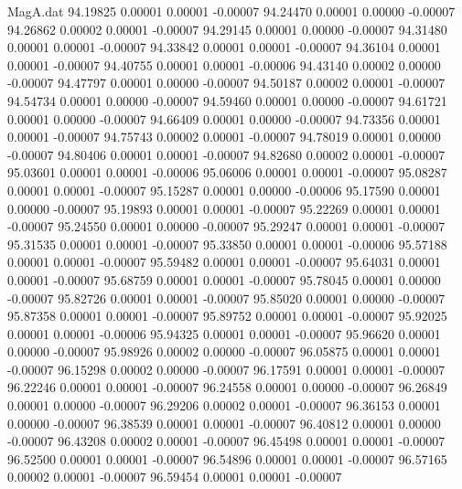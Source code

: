 \begin{filecontents}{MagA.dat}
  94.19825    0.00001    0.00001   -0.00007
  94.24470    0.00001    0.00000   -0.00007
  94.26862    0.00002    0.00001   -0.00007
  94.29145    0.00001    0.00000   -0.00007
  94.31480    0.00001    0.00001   -0.00007
  94.33842    0.00001    0.00001   -0.00007
  94.36104    0.00001    0.00001   -0.00007
  94.40755    0.00001    0.00001   -0.00006
  94.43140    0.00002    0.00000   -0.00007
  94.47797    0.00001    0.00000   -0.00007
  94.50187    0.00002    0.00001   -0.00007
  94.54734    0.00001    0.00000   -0.00007
  94.59460    0.00001    0.00000   -0.00007
  94.61721    0.00001    0.00000   -0.00007
  94.66409    0.00001    0.00000   -0.00007
  94.73356    0.00001    0.00001   -0.00007
  94.75743    0.00002    0.00001   -0.00007
  94.78019    0.00001    0.00000   -0.00007
  94.80406    0.00001    0.00001   -0.00007
  94.82680    0.00002    0.00001   -0.00007
  95.03601    0.00001    0.00001   -0.00006
  95.06006    0.00001    0.00001   -0.00007
  95.08287    0.00001    0.00001   -0.00007
  95.15287    0.00001    0.00000   -0.00006
  95.17590    0.00001    0.00000   -0.00007
  95.19893    0.00001    0.00001   -0.00007
  95.22269    0.00001    0.00001   -0.00007
  95.24550    0.00001    0.00000   -0.00007
  95.29247    0.00001    0.00001   -0.00007
  95.31535    0.00001    0.00001   -0.00007
  95.33850    0.00001    0.00001   -0.00006
  95.57188    0.00001    0.00001   -0.00007
  95.59482    0.00001    0.00001   -0.00007
  95.64031    0.00001    0.00001   -0.00007
  95.68759    0.00001    0.00001   -0.00007
  95.78045    0.00001    0.00000   -0.00007
  95.82726    0.00001    0.00001   -0.00007
  95.85020    0.00001    0.00000   -0.00007
  95.87358    0.00001    0.00001   -0.00007
  95.89752    0.00001    0.00001   -0.00007
  95.92025    0.00001    0.00001   -0.00006
  95.94325    0.00001    0.00001   -0.00007
  95.96620    0.00001    0.00000   -0.00007
  95.98926    0.00002    0.00000   -0.00007
  96.05875    0.00001    0.00001   -0.00007
  96.15298    0.00002    0.00000   -0.00007
  96.17591    0.00001    0.00001   -0.00007
  96.22246    0.00001    0.00001   -0.00007
  96.24558    0.00001    0.00000   -0.00007
  96.26849    0.00001    0.00000   -0.00007
  96.29206    0.00002    0.00001   -0.00007
  96.36153    0.00001    0.00000   -0.00007
  96.38539    0.00001    0.00001   -0.00007
  96.40812    0.00001    0.00000   -0.00007
  96.43208    0.00002    0.00001   -0.00007
  96.45498    0.00001    0.00001   -0.00007
  96.52500    0.00001    0.00001   -0.00007
  96.54896    0.00001    0.00001   -0.00007
  96.57165    0.00002    0.00001   -0.00007
  96.59454    0.00001    0.00001   -0.00007

\end{filecontents}

